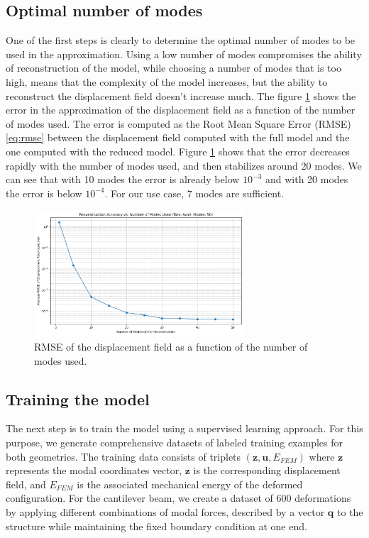\subsection{Optimal number of modes}
\label{sec:optimal_number_modes}
One of the first steps is clearly to determine the optimal number of modes to be used in the approximation. Using a low number of modes compromises the ability of reconstruction of the model, while choosing a number of modes that is too high, means that the complexity of the model increases, but the ability to reconstruct the displacement field doesn't increase much. The figure \ref{fig:optimal_number_modes} shows the error in the approximation of the displacement field as a function of the number of modes used. The error is computed as the Root Mean Square Error (RMSE) \eqref{eq:rmse} between the displacement field computed with the full model and the one computed with the reduced model. Figure \ref{fig:optimal_number_modes} shows that the error decreases rapidly with the number of modes used, and then stabilizes around 20 modes. We can see that with 10 modes the error is already below \(10^{-3}\) and with 20 modes the error is below \(10^{-4}\). For our use case, 7 modes are sufficient.
\begin{figure}[H]
    \centering
    \includegraphics[width=0.7\textwidth]{Images/rmse_vs_modes.png}
    \caption{RMSE of the displacement field as a function of the number of modes used.}
    \label{fig:optimal_number_modes}
\end{figure}

\subsection{Training the model}
\label{sec:training_model}
The next step is to train the model using a supervised learning approach. For this purpose, we generate comprehensive datasets of labeled training examples for both geometries. The training data consists of triplets $(\mathbf{z}, \mathbf{u}, E_{FEM})$ where $\mathbf{z}$ represents the modal coordinates vector, $\mathbf{z}$ is the corresponding displacement field, and $E_{FEM}$ is the associated mechanical energy of the deformed configuration.
For the cantilever beam, we create a dataset of 600 deformations by applying different combinations of modal forces, described by a vector \(\mathbf{q}\) to the structure while maintaining the fixed boundary condition at one end. 


